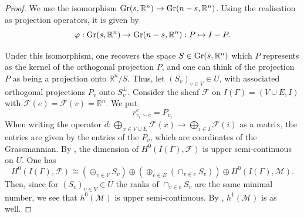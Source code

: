\documentclass{article}
\theoremstyle{definition}
\theoremstyle{remark}
\begin{document}
\begin{proof}
 We use the isomorphism $\textup{Gr}(s, \mathbb{R}^n) \rightarrow  \textup{Gr}(n-s, \mathbb{R}^n)$. Using the realisation as projection operators, it is given by
\begin{equation*}
   \varphi: \textup{Gr}(s, \mathbb{R}^n) \rightarrow  \textup{Gr}(n-s, \mathbb{R}^n): P \mapsto I - P.
\end{equation*}

Under this isomorphism, one recovers the space $S \in \textup{Gr}(s, \mathbb{R}^{n})$ which $P$ represents as the kernel of the orthogonal projection $P$, and one can think of the projection $P$ as being a projection onto $\mathbb{R}^{n}/S$. 
Thus, let $(S_{v})_{v\in V} \in U$, with associated orthogonal projections $P_{v}$ onto $S_{v}^{\perp}$. Consider the sheaf $\mathcal{F}$ on $I(\Gamma)=(V\cup E, I)$ with $\mathcal{F}(e) = \mathcal{F}(v) = \mathbb{R}^{n}$. We put
    \begin{equation*}
        r^{e}_{v_i \sim e} = P_{v_i}
    \end{equation*}
    When writing the operator $d: \bigoplus_{x\in V\cup E} \mathcal{F}(x) \rightarrow \bigoplus_{i \in I} \mathcal{F}(i)$ as a matrix, the entries are given by the entries of the $P_{v}$, which are coordinates of the Grassmannian. By , the dimension of $H^{0}(I(\Gamma), \mathcal{F})$ is upper semi-continuous on $U$.
    One has
    \begin{equation*}
        H^{0}(I(\Gamma),\mathcal{F}) \cong \left( \oplus_{v\in V} S_{v} \right) \oplus \left( \oplus_{e\in E} (\cap_{v\in e} S_{v}) \right) \oplus H^{0}(I(\Gamma), \mathcal{M}).
    \end{equation*}
    Then, since for $(S_{v})_{v\in V}\in U$ the ranks of $\cap_{v \in e} S_{v}$ are the same minimal number, we see that $h^{0}(\mathcal{M})$ is upper semi-continuous. By , $h^{1}(\mathcal{M})$ is as well. 
\end{proof}
\end{document}
